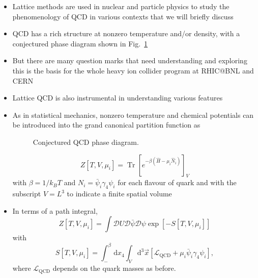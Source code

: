 \newpage
\begin{itemize}
  \item Lattice methods are used in nuclear and particle physics to study the phenomenology of QCD in various contexts that we will briefly discuss
\end{itemize}


\begin{itemize}
    \item QCD has a rich structure at nonzero temperature and/or density, with a conjectured phase diagram shown in Fig.~\ref{fig:phase}
    \item But there are many question marks that need understanding and exploring this is the basis for the whole heavy ion collider program at RHIC@BNL and CERN
    \item Lattice QCD is also instrumental in understanding various features
    \item As in statistical mechanics, nonzero temperature and chemical potentials can be introduced into the grand canonical partition function as
\begin{figure}
\caption{Conjectured QCD phase diagram.
\label{fig:phase}
}
\end{figure}
\begin{equation}
Z\left[T, V, \mu_{i}\right]=\operatorname{Tr}\left[e^{-\beta\left(\hat{H}-\mu_{i} \hat{N}_i\right)}\right]_{V}
\end{equation}
with $\beta = 1 / k_B T$ and $N_i = \bar{\psi}_i \gamma_4 \psi_i$ for each flavour of quark and with the subscript $V=L^3$ to indicate a finite spatial volume

\item In terms of a path integral,
\begin{equation}
    Z[T,V,\mu_i] = \int \mathcal{D}U \mathcal{D}\bar{\psi}\mathcal{D}\psi \exp[-S[T,V,\mu_i]]
\end{equation}
with
\begin{equation}
    S[T,V,\mu_i] = \int_-^\beta \text{d}x_4 \int_V \text{d}^3\vec{x}\left[\mathcal{L}_\text{QCD} + \mu_i \bar{\psi}_i \gamma_4 \psi_i \right],
\end{equation}
where $\mathcal{L}_\text{QCD}$ depends on the quark masses as before.
\end{itemize}

